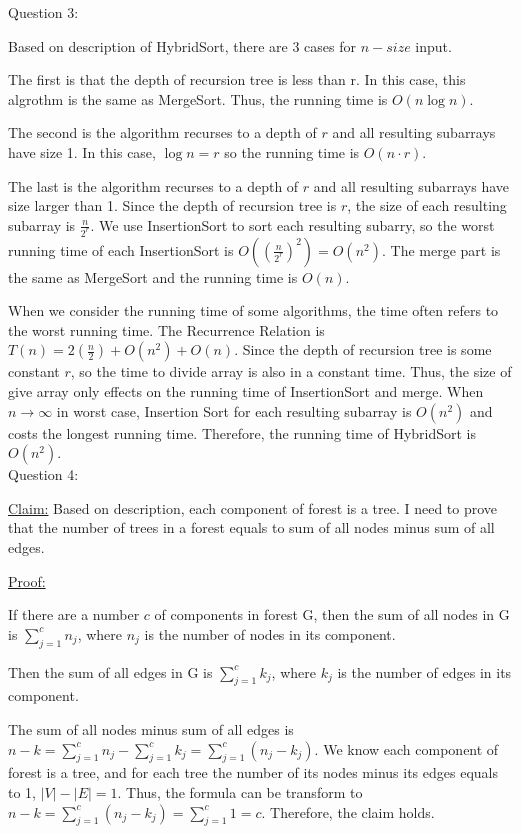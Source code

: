 \documentclass[12pt]{article}
\begin{document}
\pagebreak
\large Question 3: \vspace{5mm} \par
\normalsize 
\setlength{\baselineskip}{8mm}
Based on description of HybridSort, there are 3 cases for $n-size$ input.\par 
The first is that the depth of recursion tree is less than r. In this case, this algrothm is the same as MergeSort. Thus, the running time is $O(n\log{}{n})$. \par
The second is the algorithm recurses to a depth of $r$ and all resulting subarrays have size 1. In this case, $\log{}{n} = r$ so the running time is $O(n \cdot r)$. \par
The last is the algorithm recurses to a depth of $r$ and all resulting subarrays have size larger than 1. Since the depth of recursion tree is $r$, the size of each resulting subarray is $\frac{n}{2^r}$.
We use InsertionSort to sort each resulting subarry, so the worst running time of each InsertionSort is $O( (\frac{n}{2^r})^2 ) = O(n^2) $. 
The merge part is the same as MergeSort and the running time is $O(n)$.  \par
When we consider the running time of some algorithms, the time often refers to the worst running time. 
The Recurrence Relation is $T(n) = 2(\frac{n}{2}) + O(n^2) + O(n)$. Since the depth of recursion tree is some constant $r$, so the time to divide array is also in a constant time. 
Thus, the size of give array only effects on the running time of InsertionSort and merge. 
When $n\to\infty$ in worst case, Insertion Sort for each resulting subarray is $O(n^2)$ and costs the longest running time. Therefore, the running time of HybridSort is $O(n^2)$. \\


\pagebreak
\large Question 4: \vspace{5mm}\\
\normalsize 
\setlength{\baselineskip}{8mm}

\underline{Claim:} Based on description, each component of forest is a tree. I need to prove that the number of trees in a forest equals to sum of all nodes minus sum of all edges. \vspace{5mm}\par
\underline{Proof:} \par
If there are a number $c$ of components in forest G, then the sum of all nodes in G is $\sum_{j=1}^{c} {n_j} $, where ${n_j}$ is the number of nodes in its component. \par 
Then the sum of all edges in G is $\sum_{j=1}^{c} {k_j} $, where ${k_j}$ is the number of edges in its component. \par
The sum of all nodes minus sum of all edges is $ n - k = \sum_{j=1}^{c} {n_j} - \sum_{j=1}^{c} {k_j}  = \sum_{j=1}^{c} {(n_j - k_j)}$. 
We know each component of forest is a tree, and for each tree the number of its nodes minus its edges equals to 1, $|V| - |E| = 1$.
Thus, the formula can be transform to $n - k = \sum_{j=1}^{c} {(n_j - k_j)} = \sum_{j=1}^{c} 1 = c$.
Therefore, the claim holds.
\end{document}
